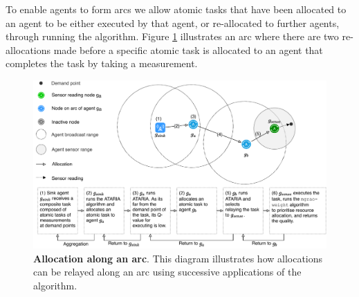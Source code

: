 To enable agents to form arcs we allow atomic tasks that have been allocated to an agent to be either executed by that agent, or re-allocated to further agents, through running the \acronymATARIA{}{} algorithm. Figure \ref{fig:arc-flow} illustrates an arc where there are two re-allocations made before a specific atomic task is allocated to an agent that completes the task by taking a measurement.
\begin{figure}[ht]
	\centering
	\includegraphics[width=0.8\linewidth, trim={25pt 0pt 25pt 0pt, clip}]{arc-flow}
	\caption{\textbf{Allocation along an arc}. This diagram illustrates how allocations can be relayed along an arc using successive applications of the \acronymATARIA{}{} algorithm.}
	\label{fig:arc-flow}
\end{figure}